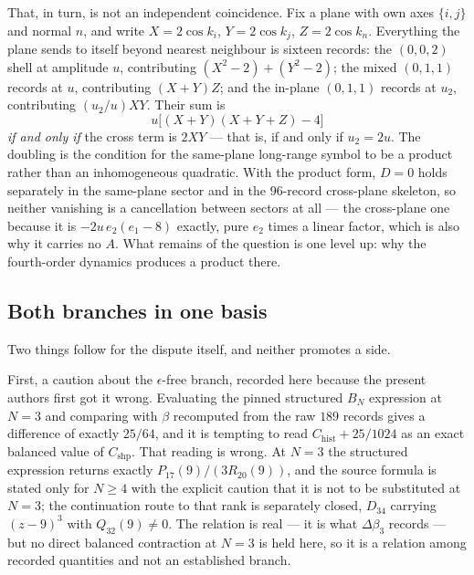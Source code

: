 \documentclass[11pt]{article}
\theoremstyle{plain}
\theoremstyle{definition}
\theoremstyle{remark}
\newcommand{\chk}[1]{}
\begin{document}
That, in turn, is not an independent coincidence. Fix a plane with own axes
$\{i,j\}$ and normal $n$, and write $X=2\cos k_i$, $Y=2\cos k_j$, $Z=2\cos k_n$.
Everything the plane sends to itself beyond nearest neighbour is sixteen
records: the $(0,0,2)$ shell at amplitude $u$, contributing $(X^2-2)+(Y^2-2)$;
the mixed $(0,1,1)$ records at $u$, contributing $(X+Y)Z$; and the in-plane
$(0,1,1)$ records at $u_2$, contributing $(u_2/u)XY$. Their sum is
\[
  u\bigl[(X+Y)(X+Y+Z)-4\bigr]
\]
\emph{if and only if} the cross term is $2XY$ --- that is, if and only if
$u_2=2u$. The doubling is the condition for the same-plane long-range symbol to
be a product rather than an inhomogeneous quadratic. With the product form,
$D=0$ holds separately in the same-plane sector and in the $96$-record
cross-plane skeleton, so neither vanishing is a cancellation between sectors at
all --- the cross-plane one because it is $-2u\,e_2(e_1-8)$ exactly, pure $e_2$
times a linear factor, which is also why it carries no $A$. What remains of the
question is one level up: why the fourth-order dynamics produces a product
there.
\chk{u2 = 2u is the cross term of a perfect square}

\subsection{Both branches in one basis}

Two things follow for the dispute itself, and neither promotes a side.

First, a caution about the $\epsilon$-free branch, recorded here because the
present authors first got it wrong. Evaluating the pinned structured $B_N$
expression at $N=3$ and comparing with $\beta$ recomputed from the raw $189$
records gives a difference of exactly $25/64$, and it is tempting to read
$C_{\mathrm{hist}}+25/1024$ as an exact balanced value of $C_{\mathrm{shp}}$.
That reading is wrong. At $N=3$ the structured expression returns exactly
$P_{17}(9)/(3R_{20}(9))$, and the source formula is stated only for $N\ge4$
with the explicit caution that it is not to be substituted at $N=3$; the
continuation route to that rank is separately closed, $D_{34}$ carrying
$(z-9)^3$ with $Q_{32}(9)\neq0$. The relation is real --- it is what
$\Delta\beta_3$ records --- but no direct balanced contraction at $N=3$ is held
here, so it is a relation among recorded quantities and not an established
branch.
\chk{RETRACTED: B\_3 - beta\_historical = 25/64 is a forbidden substitution, not an exact branch}
\end{document}
